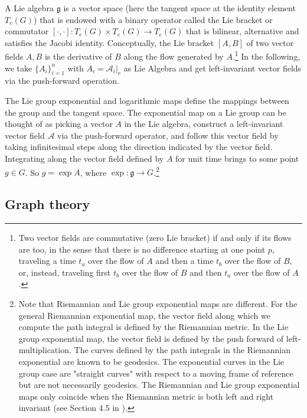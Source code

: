 \documentclass{article}
\begin{document}
A Lie algebra $\mathfrak{g}$ is a vector space (here the tangent space at the identity element $T_e(G)$) that is endowed with a binary operator called the Lie bracket or commutator $[\cdot, \cdot] : T_e(G) \times T_e(G) \to T_e(G)$ that is bilinear, alternative and satisfies the Jacobi identity. Conceptually, the Lie bracket $[A, B]$ of two vector fields $A, B$ is the derivative of $B$ along the flow generated by $A$.\footnote{Two vector fields are commutative (zero Lie bracket) if and only if its flows are too, in the sense that there is no difference starting at one point $p$, traveling a time $t_a$ over the flow of $A$ and then a time $t_b$ over the flow of $B$, or, instead, traveling first $t_b$ over the flow of $B$ and then $t_a$ over the flow of $A$.} In the following, we take $\{A_i\}_{i=1}^n$ with $A_i = \mathcal{A}_i|_e$ as Lie Algebra and get left-invariant vector fields via the push-forward operation. 

The Lie group exponential and logarithmic maps define the mappings between the group and the tangent space. The exponential map on a Lie group can be thought of as picking a vector $A$ in the Lie algebra, construct a left-invariant vector field $\mathcal{A}$ via the push-forward operator, and follow this vector field by taking infinitesimal steps along the direction indicated by the vector field. Integrating along the vector field defined by $A$ for unit time brings to some point $g \in G$. So $g = \exp A$, where $\exp: \mathfrak{g} \to G$.\footnote{Note that Riemannian and Lie group exponential maps are different. For the general Riemannian exponential map, the vector field along which we compute the path integral is defined by the Riemannian metric. In the Lie group exponential map, the vector field is defined by the push forward of left-multiplication. The curves defined by the path integrals in the Riemannian exponential are known to be geodesics. The exponential curves in the Lie group case are "straight curves" with respect to a moving frame of reference but are not necessarily geodesics. The Riemannian and Lie group exponential maps only coincide when the Riemannian metric is both left and right invariant (see Section 4.5 in \citet{bekkers2017thesis}).}



\subsection{Graph theory}
\end{document}
